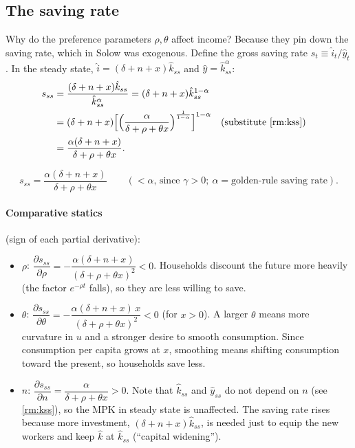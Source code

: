 \subsection{The saving rate }

Why do the preference parameters $\rho,\theta$ affect income? Because they pin down the saving rate, which in Solow was exogenous. Define the gross saving rate $s_t\equiv\hat i_t/\hat y_t$. In the steady state, $\hat i=(\delta+n+x)\hat k_{ss}$ and $\hat y=\hat k_{ss}^\alpha$:
\begin{align*}
s_{ss}&=\frac{(\delta+n+x)\hat k_{ss}}{\hat k_{ss}^\alpha}=(\delta+n+x)\hat k_{ss}^{1-\alpha}\\
&=(\delta+n+x)\Big[\Big(\frac{\alpha}{\delta+\rho+\theta x}\Big)^{\frac1{1-\alpha}}\Big]^{1-\alpha}
&&\text{(substitute \eqref{rm:kss})}\\
&=\frac{\alpha(\delta+n+x)}{\delta+\rho+\theta x}.
\end{align*}
\begin{keybox}[title={Steady-state saving rate}]
\[
s_{ss}=\frac{\alpha(\delta+n+x)}{\delta+\rho+\theta x}\qquad(<\alpha\text{, since }\gamma>0;\ \alpha=\text{golden-rule saving rate}).
\]
\end{keybox}

\paragraph{Comparative statics} (sign of each partial derivative):
\begin{itemize}
\item $\rho$: $\dfrac{\partial s_{ss}}{\partial\rho}=-\dfrac{\alpha(\delta+n+x)}{(\delta+\rho+\theta x)^2}<0$. Households discount the future more heavily (the factor $e^{-\rho t}$ falls), so they are less willing to save.
\item $\theta$: $\dfrac{\partial s_{ss}}{\partial\theta}=-\dfrac{\alpha(\delta+n+x)\,x}{(\delta+\rho+\theta x)^2}<0$ (for $x>0$). A larger $\theta$ means more curvature in $u$ and a stronger desire to smooth consumption. Since consumption per capita grows at $x$, smoothing means shifting consumption toward the present, so households save less.
\item $n$: $\dfrac{\partial s_{ss}}{\partial n}=\dfrac{\alpha}{\delta+\rho+\theta x}>0$. Note that $\hat k_{ss}$ and $\hat y_{ss}$ do not depend on $n$ (see \eqref{rm:kss}), so the MPK in steady state is unaffected. The saving rate rises because more investment, $(\delta+n+x)\hat k_{ss}$, is needed just to equip the new workers and keep $\hat k$ at $\hat k_{ss}$ (``capital widening'').
\end{itemize}

